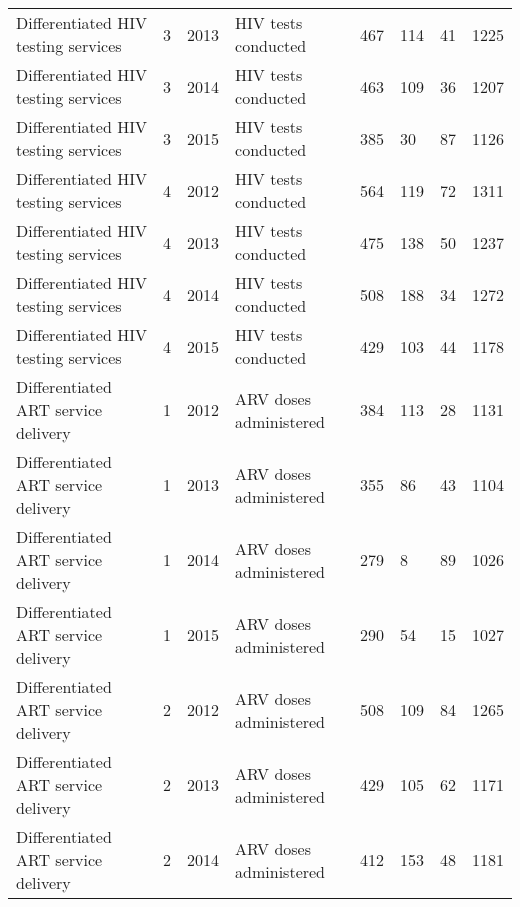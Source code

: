 \documentclass{article}
\begin{document}
\begin{table}[]
\begin{tabular}{llllllll}
Differentiated HIV testing services                    & 3    & 2013 & HIV tests conducted              & 467       & 114                & 41              & 1225   \\
Differentiated HIV testing services                    & 3    & 2014 & HIV tests conducted              & 463       & 109                & 36              & 1207   \\
Differentiated HIV testing services                    & 3    & 2015 & HIV tests conducted              & 385       & 30                 & 87              & 1126   \\
Differentiated HIV testing services                    & 4    & 2012 & HIV tests conducted              & 564       & 119                & 72              & 1311   \\
Differentiated HIV testing services                    & 4    & 2013 & HIV tests conducted              & 475       & 138                & 50              & 1237   \\
Differentiated HIV testing services                    & 4    & 2014 & HIV tests conducted              & 508       & 188                & 34              & 1272   \\
Differentiated HIV testing services                    & 4    & 2015 & HIV tests conducted              & 429       & 103                & 44              & 1178   \\
Differentiated ART service delivery & 1    & 2012 & ARV doses administered          & 384       & 113                & 28              & 1131   \\
Differentiated ART service delivery & 1    & 2013 & ARV doses administered          & 355       & 86                 & 43              & 1104   \\
Differentiated ART service delivery & 1    & 2014 & ARV doses administered          & 279       & 8                  & 89              & 1026   \\
Differentiated ART service delivery & 1    & 2015 & ARV doses administered          & 290       & 54                 & 15              & 1027   \\
Differentiated ART service delivery & 2    & 2012 & ARV doses administered          & 508       & 109                & 84              & 1265   \\
Differentiated ART service delivery & 2    & 2013 & ARV doses administered          & 429       & 105                & 62              & 1171   \\
Differentiated ART service delivery & 2    & 2014 & ARV doses administered          & 412       & 153                & 48              & 1181   \\

\end{tabular}
\end{table}
\end{document}
